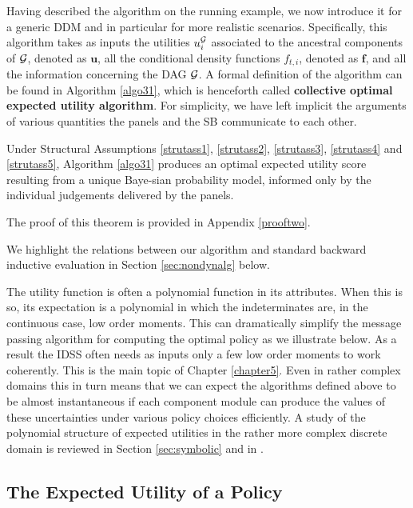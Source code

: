 Having described the algorithm on the running example, we now introduce it for a generic DDM and in particular for more realistic scenarios. Specifically, this algorithm takes as inputs the utilities $u^{\mathcal{G}}_i$ associated to the ancestral components of $\mathcal{G}$, denoted as $\bm{u}$, all the conditional density functions $f_{t,i}$, denoted as $\bm{f}$, and all the information concerning the DAG $\mathcal{G}$.  A formal definition of the algorithm can be found in Algorithm \ref{algo31}, which is henceforth called  \textbf{collective optimal expected utility algorithm}.  For simplicity, we have left implicit the arguments of various quantities the panels and the SB communicate to each other. 
\begin{theorem}
Under  Structural Assumptions  \ref{strutass1}, \ref{strutass2}, \ref{strutass3}, \ref{strutass4} and \ref{strutass5},  Algorithm  \ref{algo31}  produces  an  optimal  expected utility score resulting from a unique Baye-sian probability model, informed only by the individual judgements delivered by the panels.
\label{teoalgo}
 \end{theorem}
The proof of this theorem is provided in Appendix \ref{prooftwo}.

We highlight the relations between our algorithm and standard backward inductive evaluation in Section \ref{sec:nondynalg} below.

The utility function is often a polynomial function in its attributes. When this is so, its expectation is a polynomial in which the indeterminates are, in the continuous case, low order moments. This can dramatically simplify the message passing algorithm for computing the optimal policy as we illustrate below. As a result the IDSS often needs as inputs only a few low order moments to work coherently. This is the main topic of Chapter \ref{chapter5}. Even in rather complex domains this in turn means that we can expect  the algorithms defined above to be almost instantaneous if each component module can produce the values of these uncertainties under various policy choices efficiently.  A study of the polynomial structure of expected utilities in the rather more complex discrete domain is reviewed in Section \ref{sec:symbolic} and in \citet{Leonelli2015a}.


\subsection{The Expected Utility of a Policy}

